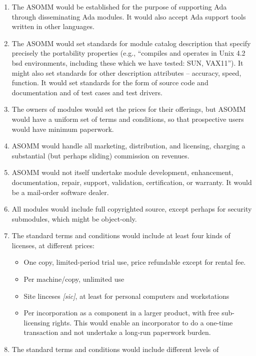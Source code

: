 \documentclass[11pt,final]{article}
\begin{document}
\begin{enumerate}
    \item The ASOMM would be established for the purpose of supporting Ada
        through disseminating Ada modules. It would also accept Ada support
        tools written in other languages.
    \item The ASOMM would set standards for module catalog description that
        specify precisely the portability properties (e.g., “compiles and
        operates in Unix 4.2 bsd environments, including these which we have
        tested: SUN, VAX11”). It might also set standards for other description
        attributes – accuracy, speed, function. It would set standards for the
        form of source code and documentation and of test cases and test
        drivers.
    \item The owners of modules would set the prices for their offerings, but
        ASOMM would have a uniform set of terms and conditions, so that
        prospective users would have minimum paperwork.
    \item ASOMM would handle all marketing, distribution, and licensing,
        charging a substantial (but perhaps sliding) commission on revenues.
    \item ASOMM would not itself undertake module development, enhancement,
        documentation, repair, support, validation, certification, or warranty.
        It would be a mail-order software dealer.
    \item All modules would include full copyrighted source, except perhaps for
        security submodules, which might be object-only.
    \item The standard terms and conditions would include at least four kinds
        of licenses, at different prices:
\begin{itemize}
        \item One copy, limited-period trial use, price refundable except for
            rental fee.
        \item Per machine/copy, unlimited use
        \item Site linceses \emph{[sic]}, at least for personal computers and
            workstations
        \item Per incorporation as a component in a larger product, with free
            sub-licensing rights. This would enable an incorporator to do a
            one-time transaction and not undertake a long-run paperwork burden.
\end{itemize}
    \item The standard terms and conditions would include different levels of

\end{enumerate}
\end{document}
